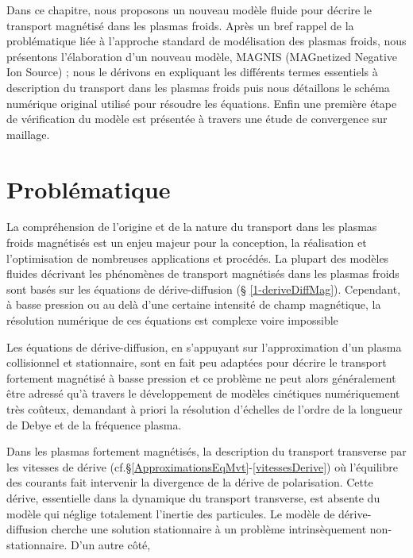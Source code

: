 \begin{refsection}


Dans ce chapitre, nous proposons un nouveau modèle fluide pour décrire le
transport magnétisé dans les plasmas froids. Après un bref rappel de
la problématique liée à l'approche standard de modélisation des plasmas froids,
nous présentons l'élaboration d'un nouveau modèle, MAGNIS (MAGnetized Negative
Ion Source) ; nous le dérivons en expliquant les différents termes
essentiels à description du transport dans les plasmas froids puis nous détaillons le
schéma numérique original utilisé pour résoudre les équations. Enfin une
première étape de vérification du modèle est présentée à travers une étude de
convergence sur maillage.

\section{Problématique}

La compréhension de l'origine et de la nature du transport dans les plasmas
froids magnétisés est un enjeu majeur pour la conception, la réalisation et
l'optimisation de nombreuses applications et procédés. La plupart des modèles
fluides décrivant les phénomènes de transport magnétisés dans les plasmas
froids sont basés sur les équations de dérive-diffusion (\S
\ref{1-deriveDiffMag}).
 Cependant, à basse pression ou au delà d'une
certaine intensité de champ magnétique, la résolution numérique de ces
équations est complexe voire impossible 

Les équations de dérive-diffusion, en s'appuyant sur l'approximation d'un plasma
collisionnel et stationnaire, sont en fait peu adaptées pour décrire le
transport fortement magnétisé à basse pression et ce problème ne peut alors
généralement être adressé qu'à travers le développement de modèles cinétiques
numériquement très coûteux, demandant à priori la résolution d'échelles de
l'ordre de la longueur de Debye et de la fréquence plasma.



Dans les plasmas fortement magnétisés, la description du transport transverse
par les vitesses de dérive (cf.\S\ref{ApproximationsEqMvt}-\ref{vitessesDerive})
où l'équilibre des courants fait intervenir la divergence de la dérive de
polarisation. Cette dérive, essentielle dans la dynamique du transport
transverse, est absente du modèle qui néglige totalement l'inertie des
particules. Le modèle de dérive-diffusion cherche une solution stationnaire à
un problème intrinsèquement non-stationnaire.
\parencite{Fruchtman}
\parencite{Sternberg}
D'un autre côté,


\end{refsection}
